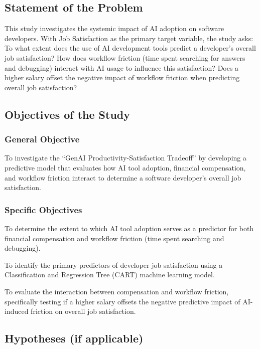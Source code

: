 \documentclass[
]{article}
\begin{document}
\subsection{Statement of the Problem}\label{statement-of-the-problem}

This study investigates the systemic impact of AI adoption on software
developers. With Job Satisfaction as the primary target variable, the
study asks: To what extent does the use of AI development tools predict
a developer's overall job satisfaction? How does workflow friction (time
spent searching for answers and debugging) interact with AI usage to
influence this satisfaction? Does a higher salary offset the negative
impact of workflow friction when predicting overall job satisfaction?

\subsection{Objectives of the Study}\label{objectives-of-the-study}

\subsubsection{General Objective}\label{general-objective}

To investigate the ``GenAI Productivity-Satisfaction Tradeoff'' by
developing a predictive model that evaluates how AI tool adoption,
financial compensation, and workflow friction interact to determine a
software developer's overall job satisfaction.

\subsubsection{Specific Objectives}\label{specific-objectives}

To determine the extent to which AI tool adoption serves as a predictor
for both financial compensation and workflow friction (time spent
searching and debugging).

To identify the primary predictors of developer job satisfaction using a
Classification and Regression Tree (CART) machine learning model.

To evaluate the interaction between compensation and workflow friction,
specifically testing if a higher salary offsets the negative predictive
impact of AI-induced friction on overall job satisfaction.

\subsection{Hypotheses (if applicable)}\label{hypotheses-if-applicable}
\end{document}
